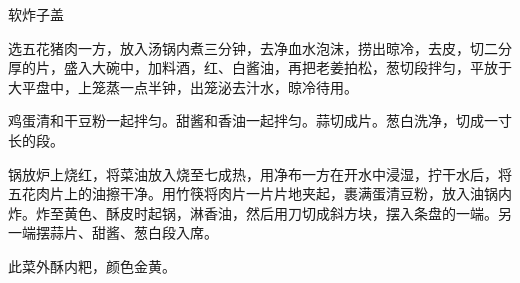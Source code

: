 \begin{recipe}{软炸子盖}

\ingredients


\cooking

\step 选五花猪肉一方，放入汤锅内煮三分钟，去净血水泡沫，捞出晾冷，去皮，切二分厚的片，盛入大碗中，加料酒，红、白酱油，再把老姜拍松，葱切段拌匀，平放于大平盘中，上笼蒸一点半钟，出笼泌去汁水，晾冷待用。

\step 鸡蛋清和干豆粉一起拌匀。甜酱和香油一起拌匀。蒜切成片。葱白洗净，切成一寸长的段。

\step 锅放炉上烧红，将菜油放入烧至七成热，用净布一方在开水中浸湿，拧干水后，将五花肉片上的油擦干净。用竹筷将肉片一片片地夹起，裹满蛋清豆粉，放入油锅内炸。炸至黄色、酥皮时起锅，淋香油，然后用刀切成斜方块，摆入条盘的一端。另一端摆蒜片、甜酱、葱白段入席。

\notes

此菜外酥内粑，颜色金黄。

\end{recipe}

